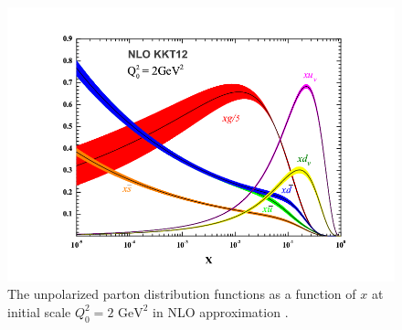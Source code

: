 \documentclass[abstract = on,listof=totoc, bibliography=totoc]{scrreprt}
\begin{document}
\begin{figure}
\begin{center}
\includegraphics[width = .8\textwidth]{unpolDistFunct}
\caption[unpolarized parton distrubution function]{The unpolarized parton distribution functions as a function of $x$ at initial scale $Q^2_0 = 2 \text{ GeV}^2$ in NLO approximation \cite{unpolDisFuncPic}.}
\label{fig:f1}
\end{center}
\end{figure}

\FloatBarrier
\end{document}
